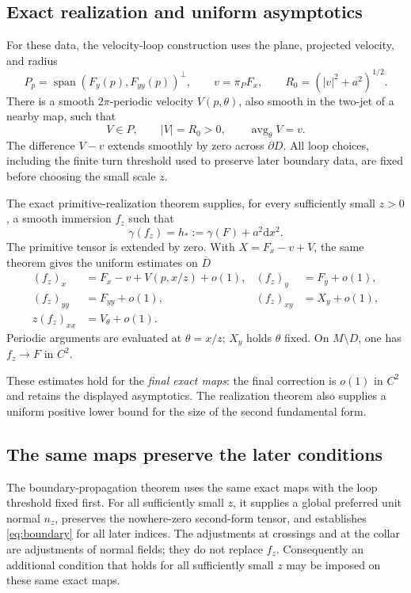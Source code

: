 \documentclass[11pt,a4paper]{article}
\newcommand{\dd}{\mathrm d}
\newcommand{\Span}{\operatorname{span}}
\newcommand{\avg}{\operatorname{avg}}
\theoremstyle{definition}
\theoremstyle{remark}
\numberwithin{equation}{section}
\begin{document}
\subsection{Exact realization and uniform asymptotics}
For these data, the velocity-loop construction uses the plane, projected
velocity, and radius
\begin{equation}
 P_p=\Span(F_y(p),F_{yy}(p))^\perp,\qquad
 v=\pi_PF_x,\qquad R_0=(|v|^2+a^2)^{1/2}.
 \label{eq:plane}
\end{equation}
There is a smooth $2\pi$-periodic velocity $V(p,\theta)$, also smooth in
the two-jet of a nearby map, such that
\begin{equation}
 V\in P,\qquad |V|=R_0>0,\qquad \avg_\theta V=v.
 \label{eq:velocity}
\end{equation}
The difference $V-v$ extends smoothly by zero across $\partial D$.
All loop choices, including the finite turn threshold used to preserve
later boundary data, are fixed before choosing the small scale $z$.

The exact primitive-realization theorem supplies, for every sufficiently
small $z>0$, a smooth immersion $f_z$ such that
\begin{equation}
 \gamma(f_z)=h_*:=\gamma(F)+a^2\dd x^2.
 \label{eq:exact}
\end{equation}
The primitive tensor is extended by zero. With $X=F_x-v+V$, the same
theorem gives the uniform estimates on $\overline D$
\begin{equation}
 \begin{aligned}
 (f_z)_x&=F_x-v+V(p,x/z)+o(1),& (f_z)_y&=F_y+o(1),\\
 (f_z)_{yy}&=F_{yy}+o(1),& (f_z)_{xy}&=X_y+o(1),\\
 z(f_z)_{xx}&=V_\theta+o(1).
 \end{aligned}
 \label{eq:asymptotics}
\end{equation}
Periodic arguments are evaluated at $\theta=x/z$; $X_y$ holds $\theta$
fixed. On $M\setminus D$, one has $f_z\to F$ in $C^2$.

These estimates hold for the \emph{final exact maps}: the final correction
is $o(1)$ in $C^2$ and retains the displayed asymptotics. The realization
theorem also supplies a uniform positive lower bound for the size of the
second fundamental form.

\subsection{The same maps preserve the later conditions}
The boundary-propagation theorem uses the same exact maps with the loop
threshold fixed first. For all sufficiently small $z$, it supplies a global
preferred unit normal $n_z$, preserves the nowhere-zero second-form
tensor, and establishes \eqref{eq:boundary} for all later indices.
The adjustments at crossings and at the collar are adjustments of
normal fields; they do not replace $f_z$. Consequently an additional
condition that holds for all sufficiently small $z$ may be imposed on
these same exact maps.
\end{document}
